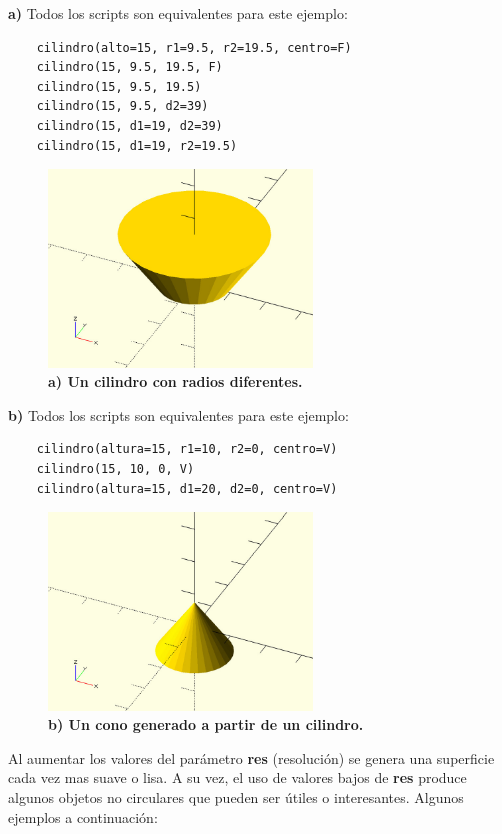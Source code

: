 \textbf{a)} Todos los scripts son equivalentes para este ejemplo:


\begin{verbatim}
    cilindro(alto=15, r1=9.5, r2=19.5, centro=F)
    cilindro(15, 9.5, 19.5, F)
    cilindro(15, 9.5, 19.5)
    cilindro(15, 9.5, d2=39)
    cilindro(15, d1=19, d2=39)
    cilindro(15, d1=19, r2=19.5)
\end{verbatim}


\begin{figure}[h]
\includegraphics[width=7cm]{Img/Modelos/modelado5.jpg}
\centering
\caption{\textbf{a) \footnotesize{Un cilindro con radios diferentes. }}}
\end{figure}

\textbf{b)} Todos los scripts son equivalentes para este ejemplo:

\begin{verbatim}
    cilindro(altura=15, r1=10, r2=0, centro=V)
    cilindro(15, 10, 0, V)
    cilindro(altura=15, d1=20, d2=0, centro=V)
\end{verbatim}

\begin{figure}[h]
\includegraphics[width=7cm]{Img/Modelos/modelado6.jpg}
\centering
\caption{\textbf{b) \footnotesize{Un cono generado a partir de un cilindro.}}}
\end{figure}

Al aumentar los valores del parámetro \textbf{res} (resolución) se genera una superficie cada vez mas suave o lisa. A su vez, el uso de valores bajos de \textbf{res} produce algunos objetos no circulares que pueden ser útiles o interesantes. Algunos ejemplos a continuación:

